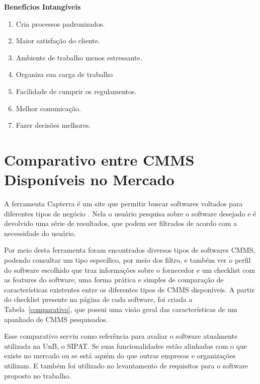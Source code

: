\textbf{Benefícios Intangíveis}

\begin{enumerate}
	\item Cria processos padronizados.
	\item Maior satisfação do cliente.
	\item Ambiente de trabalho menos estressante.
	\item Organiza sua carga de trabalho
	\item Facilidade de cumprir os regulamentos.
	\item Melhor comunicação.
	\item Fazer decisões melhores.
\end{enumerate}






\section{Comparativo entre CMMS Disponíveis no Mercado}

A ferramenta Capterra é um site que permitir buscar softwares voltados para diferentes tipos de negócio \cite{capterra}. Nela o usuário pesquisa sobre o software desejado e é devolvido uma série de resultados, que podem ser filtrados de acordo com a necessidade do usuário.

Por meio desta ferramenta foram encontrados diversos tipos de softwares CMMS, podendo consultar um tipo específico, por meio dos filtro, e também ver o perfil do software escolhido que traz informações sobre o fornecedor e um checklist com as features do software, uma forma prática e simples de comparação de características existentes entre os diferentes tipos de CMMS disponíveis. A partir do checklist presente na página de cada software, foi criada a Tabela~\ref{comparativo}, que possui uma visão geral das características de um apanhado de CMMS pesquisados.

Esse comparativo serviu como referência para avaliar o software atualmente utilizada na UnB, o SIPAT. Se suas funcionalidades estão alinhadas com o que existe no mercado ou se está aquém do que outras empresas e organizações utilizam. E também foi utilizado no levantamento de requisitos para o software proposto no trabalho.

